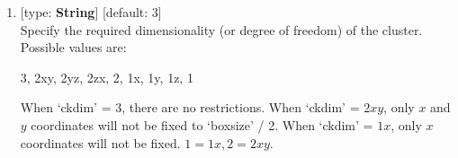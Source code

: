 \documentclass[11pt]{book}
\begin{document}
\begin{enumerate}
\begin{enumerate}
		\emph{n}-fold rotary $\alpha$ axis symmetry
	\item \textbf{C\emph{n}$\alpha$h} ($\alpha$=\emph{x, y, z}, \emph{n} = 2, 3, 4, 5, 6, ...): for example, \\
		\textbf{C\emph{n}\emph{x}h}: \emph{n}-fold axis along \emph{x}, horizontal mirror plane along \emph{yz}-plane
	\item \textbf{C\emph{n}$\alpha$v$\beta$} ($\alpha, \beta$=\emph{x, y, z}, \emph{n} = 2, 3, 4, 5, 6, ...; 
		$\alpha$ and $\beta$ must be different): for example, \\
		\textbf{C\emph{nx}v\emph{y}}: \emph{n}-fold axis along \emph{x}, vertical mirror plane along \emph{xy}-plane
	\item \textbf{S\emph{n}$\alpha$} ($\alpha$=\emph{x, y, z}, \emph{n} = 4, 6, 8, 10, ...): 
		\emph{n}-fold $\alpha$ axis rotary reflection
	\item \textbf{D\emph{n}$\alpha\beta$} ($\alpha, \beta$=\emph{x, y, z}, \emph{n} = 2, 3, 4, 5, 6, ...; 
		$\alpha$ and $\beta$ must be different): for example, \\
		\textbf{D\emph{nxy}}: \emph{n}-fold axis along \emph{x}, one of C2 axis along \emph{y}
	\item \textbf{D\emph{n}$\alpha\beta$h} ($\alpha, \beta$=\emph{x, y, z}, \emph{n} = 2, 3, 4, 5, 6, ...; 
		$\alpha$ and $\beta$ must be different): for example, \\
		\textbf{D\emph{nxy}h}: \emph{n}-fold axis along \emph{x}, one of C2 axis along \emph{y}, 
		horizontal mirror plane vertical to \emph{x}
	\item \textbf{D\emph{n}$\alpha\beta$d} ($\alpha, \beta$=\emph{x, y, z}, \emph{n} = 2, 3, 4, 5, 6, ...; 
		$\alpha$ and $\beta$ must be different): for example, \\
		\textbf{D\emph{nxy}d}: \emph{n}-fold axis along \emph{x}, one of C2 axis along \emph{y}
	\end{enumerate}
\item {} [type: \textbf{String}] [default: 3] \\
	Specify the required dimensionality (or degree of freedom) of the cluster.
	Possible values are:
\begin{everbatim}
3, 2xy, 2yz, 2zx, 2, 1x, 1y, 1z, 1
\end{everbatim}
	When `ckdim' = 3, there are no restrictions. When `ckdim' = $2xy$, only $x$ and $y$ coordinates will not be fixed 
	to `boxsize' / 2. When `ckdim' = $1x$, only $x$ coordinates will not be fixed. $1 = 1x, 2 = 2xy$.

\end{enumerate}
\end{document}
